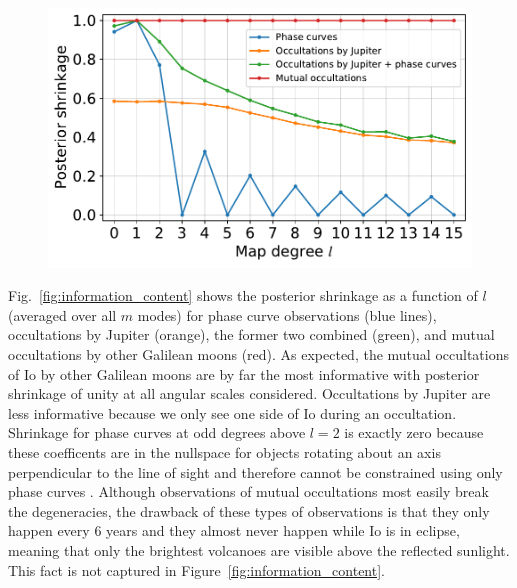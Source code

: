 \documentclass[modern]{aastex62}
\begin{document}
\begin{figure}[t!]
    \begin{centering}
    \includegraphics[width=\linewidth]{figures/information_content.pdf}
    \end{centering}
\end{figure}

Fig.~\ref{fig:information_content} shows the posterior shrinkage as a function of $l$ (averaged over all $m$ modes) for phase curve observations (blue lines), occultations by Jupiter (orange), the former two combined (green), and mutual occultations by other Galilean moons (red).
As expected, the mutual occultations of Io by other Galilean moons are by far the most informative with posterior shrinkage of unity at all angular scales considered. 
Occultations by Jupiter are less informative because we only see one side of Io during an occultation.
Shrinkage for phase curves at odd degrees above $l=2$ is exactly zero because these coefficents are in the nullspace for objects rotating about an axis perpendicular to the line of sight and therefore cannot be constrained using only phase curves \citep{luger2021}. 
Although observations of mutual occultations most easily break the degeneracies, the drawback of these types of observations is that they only happen every 6 years and they almost never happen while Io is in eclipse, meaning that only the brightest volcanoes are visible above the reflected sunlight.
This fact is not captured in Figure~\ref{fig:information_content}. 
\end{document}
